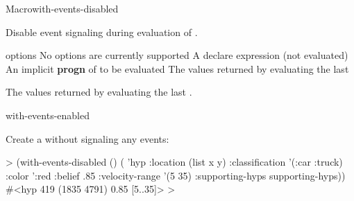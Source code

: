 \documentclass[10pt,twoside,english,pdftex]{article}
\begin{document}

\begin{functiondoc}{Macro}{with-events-disabled}%
  {\code{(}\superstar{}\code{)}
    \superstar{}
    \superstar{}
    \returns{} \superstar}
%
%
  
\fnsyntax

\fnpurpose Disable event signaling during evaluation of .

\fnpackage {}

\fnmodule {}

\fnargs
\begin{args}{options}
\arg[option] No options are currently supported
\arg[declaration] A declare expression (not evaluated)
\arg[forms] An implicit \textbf{progn} of  to be evaluated
\arg[results] The values returned by evaluating the last 
\end{args}

\fnreturns The values returned by evaluating the last .

\begin{alsos}{with-events-enabled}
\end{alsos}

\fnexample
{}%
Create a  without signaling any events:
%
\W\supp
\begin{example}
  > (with-events-disabled ()
       ( 'hyp 
          :location (list x y)
          :classification '(:car :truck)
          :color ':red
          :belief .85
          :velocity-range '(5 35)
          :supporting-hyps supporting-hyps))
  #<hyp 419 (1835 4791) 0.85 [5..35]>
  >
\end{example}

\end{functiondoc}

\end{document}

